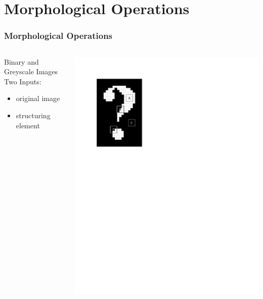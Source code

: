 \documentclass{beamer}
\begin{document}
\section[Morphological Operations]{Morphological Operations}

\begin{frame}
\frametitle{Morphological Operations}
\begin{columns}
\begin{column}{0.5\textwidth}
Binary and Greyscale Images
\linebreak
\linebreak
Two Inputs:
\begin{itemize}
\item original image
\item structuring element
\end{itemize}
\end{column}
\begin{column}{0.5\textwidth}
\includegraphics[width=1\textwidth,trim={0 6.5in 4in 0},clip]{structuring_element_placement}
\end{column}
\end{columns}
\end{frame}
\end{document}
